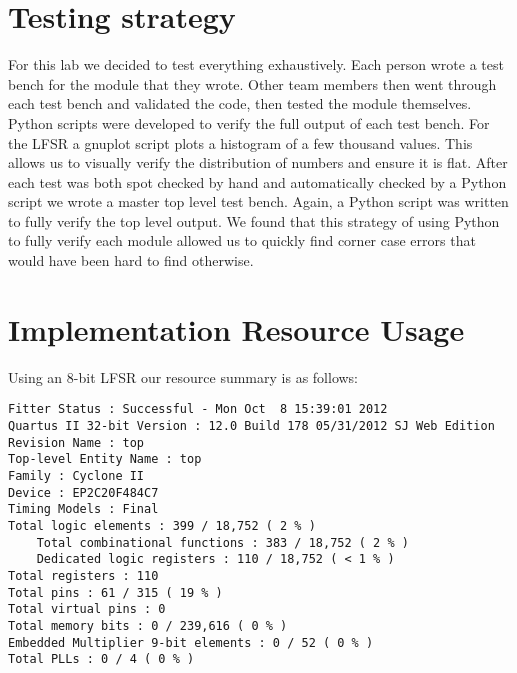 \documentclass[12pt]{article}
\begin{document}
\section*{Testing strategy}
For this lab we decided to test everything exhaustively. Each person wrote a test bench for the module that they wrote. Other team members then went through each test bench and validated the code, then tested the module themselves. Python scripts were developed to verify the full output of each test bench. For the LFSR a gnuplot script plots a histogram of a few thousand values. This allows us to visually verify the distribution of numbers and ensure it is flat. After each test was both spot checked by hand and automatically checked by a Python script we wrote a master top level test bench. Again, a Python script was written to fully verify the top level output. We found that this strategy of using Python to fully verify each module allowed us to quickly find corner case errors that would have been hard to find otherwise.

\newpage
\section*{Implementation Resource Usage}


Using an 8-bit LFSR our resource summary is as follows:

\begin{verbatim}
Fitter Status : Successful - Mon Oct  8 15:39:01 2012
Quartus II 32-bit Version : 12.0 Build 178 05/31/2012 SJ Web Edition
Revision Name : top
Top-level Entity Name : top
Family : Cyclone II
Device : EP2C20F484C7
Timing Models : Final
Total logic elements : 399 / 18,752 ( 2 % )
    Total combinational functions : 383 / 18,752 ( 2 % )
    Dedicated logic registers : 110 / 18,752 ( < 1 % )
Total registers : 110
Total pins : 61 / 315 ( 19 % )
Total virtual pins : 0
Total memory bits : 0 / 239,616 ( 0 % )
Embedded Multiplier 9-bit elements : 0 / 52 ( 0 % )
Total PLLs : 0 / 4 ( 0 % )
\end{verbatim}
\end{document}
